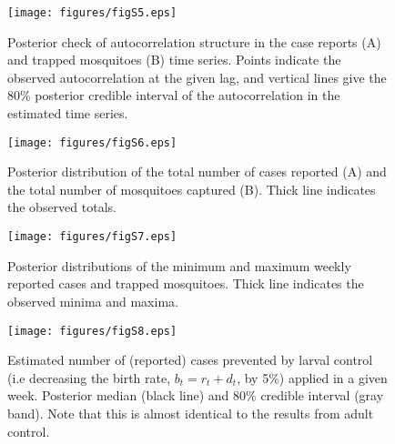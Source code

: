 \documentclass[12pt,letterpaper]{article}
\begin{document}
\begin{figure}[!h]
\texttt{[image: figures/figS5.eps]}
\caption{Posterior check of autocorrelation structure in the case reports (A) and trapped mosquitoes (B) time series.  Points indicate the observed autocorrelation at the given lag, and vertical lines give the 80\% posterior credible interval of the autocorrelation in the estimated time series.
}
\end{figure}

\begin{figure}[!h]
\texttt{[image: figures/figS6.eps]}
\caption{
Posterior distribution of the total number of cases reported (A) and the total number of mosquitoes captured (B).  Thick line indicates the observed totals.
}
\end{figure}

\begin{figure}[!h]
\texttt{[image: figures/figS7.eps]}
\caption{
Posterior distributions of the minimum and maximum weekly reported cases and trapped mosquitoes. Thick line indicates the observed minima and maxima.
}
\end{figure}

\begin{figure}[!h]
\texttt{[image: figures/figS8.eps]}
\caption{
Estimated number of (reported) cases prevented by larval control (i.e decreasing the birth rate, $b_t = r_t + d_t$, by 5\%) applied in a given week. Posterior median (black line) and 80\% credible interval (gray band). Note that this is almost identical to the results from adult control.
}
\end{figure}
\end{document}
